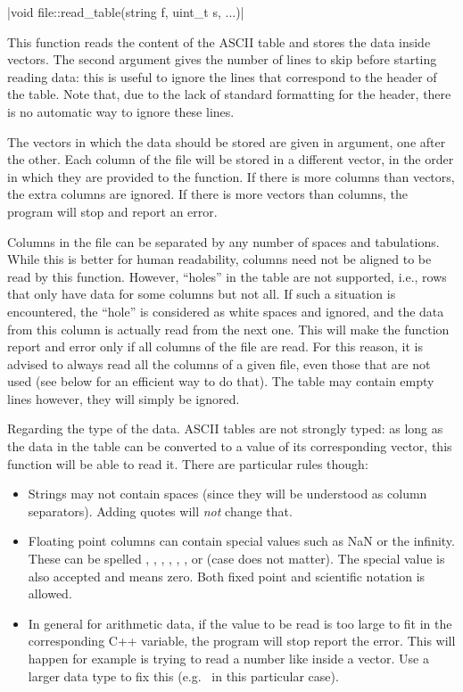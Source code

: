 \funcitem \cppinline|void file::read_table(string f, uint_t s, ...)| 

This function reads the content of the ASCII table  and stores the data inside vectors. The second argument  gives the number of lines to skip before starting reading data: this is useful to ignore the lines that correspond to the header of the table. Note that, due to the lack of standard formatting for the header, there is no automatic way to ignore these lines.

The vectors in which the data should be stored are given in argument, one after the other. Each column of the file will be stored in a different vector, in the order in which they are provided to the function. If there is more columns than vectors, the extra columns are ignored. If there is more vectors than columns, the program will stop and report an error.

Columns in the file can be separated by any number of spaces and tabulations. While this is better for human readability, columns need not be aligned to be read by this function. However, ``holes'' in the table are not supported, i.e., rows that only have data for some columns but not all. If such a situation is encountered, the ``hole'' is considered as white spaces and ignored, and the data from this column is actually read from the next one. This will make the function report and error only if all columns of the file are read. For this reason, it is advised to always read all the columns of a given file, even those that are not used (see below for an efficient way to do that). The table may contain empty lines however, they will simply be ignored.

Regarding the type of the data. ASCII tables are not strongly typed: as long as the data in the table can be converted to a value of its corresponding vector, this function will be able to read it. There are particular rules though:
\begin{itemize}
\item Strings may not contain spaces (since they will be understood as column separators). Adding quotes  will \emph{not} change that.
\item Floating point columns can contain special values such as NaN or the infinity. These can be spelled , , , , , ,  or  (case does not matter). The special value  is also accepted and means zero. Both fixed point and scientific notation is allowed.
\item In general for arithmetic data, if the value to be read is too large to fit in the corresponding C++ variable, the program will stop report the error. This will happen for example is trying to read a number like  inside a  vector. Use a larger data type to fix this (e.g.~ in this particular case).
\end{itemize}

